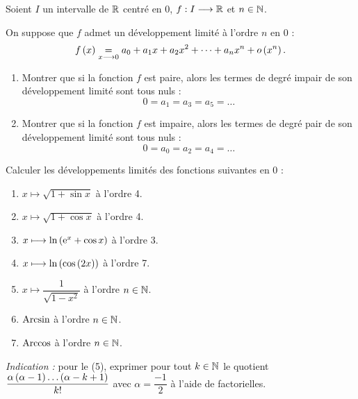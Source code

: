 \begin{exo}[Exercice 5]
Soient \(I\) un intervalle de \(\mathbb{R}\) centré en \(0\), \(f:I\longrightarrow\mathbb{R}\) et \(n\in\mathbb{N}\).

On suppose que \(f\) admet un développement limité à l'ordre \(n\) en \(0\) : \[f\left(x\right)\underset{x\longrightarrow0}{=}a_0+a_1x+a_2x^2+\dots+a_nx^n+o\left(x^n\right).\]

\begin{enumerate}
\item Montrer que si la fonction \(f\) est paire, alors les termes de degré impair de son développement limité sont tous nuls : \[0=a_1=a_3=a_5=\dots\]

\item Montrer que si la fonction \(f\) est impaire, alors les termes de degré pair de son développement limité sont tous nuls : \[0=a_0=a_2=a_4=\dots\]
\end{enumerate}
\end{exo}

\begin{corr}
\end{corr}

\begin{exo}[Exercice 6]
Calculer les développements limités des fonctions suivantes en \(0\) :

\begin{enumerate}
\item \(x\mapsto\sqrt{1+\sin x}\) à l'ordre 4. \\

\item \(x\mapsto\sqrt{1+\cos x}\) à l'ordre 4. \\

\item \(x\longmapsto\ln\left(\mathrm{e}^{x}+\cos x\right)\) à l'ordre 3. \\

\item \(x\longmapsto\ln\left(\cos\left(2x\right)\right)\) à l'ordre 7. \\

\item \(x\mapsto\dfrac{1}{\sqrt{1-x^2}}\) à l'ordre \(n\in\mathbb{N}\). \\

\item \(\operatorname{Arcsin}\) à l'ordre \(n\in\mathbb{N}\). \\

\item \(\operatorname{Arccos}\) à l'ordre \(n\in\mathbb{N}\).
\end{enumerate}

\textit{Indication :} pour le (5), exprimer pour tout \(k\in\mathbb{N}\) le quotient \(\dfrac{\alpha\left(\alpha-1\right)\dots\left(\alpha-k+1\right)}{k!}\) avec \(\alpha=\dfrac{-1}{2}\) à l'aide de factorielles.
\end{exo}

